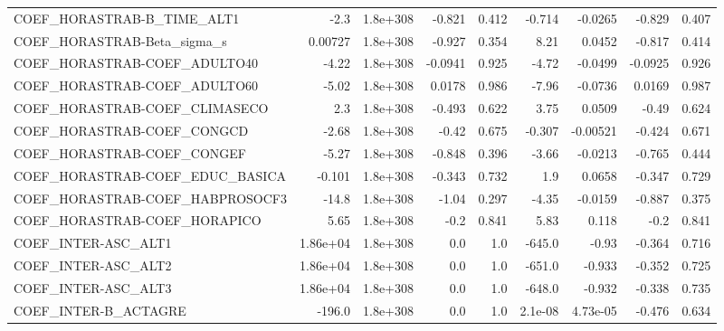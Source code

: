 \begin{tabular}{lrrrrrrrr}
COEF\_HORASTRAB-B\_TIME\_ALT1        &        -2.3 &     1.8e+308 &  -0.821 &    0.412 &     -0.714 &     -0.0265 &       -0.829 &         0.407 \\
COEF\_HORASTRAB-Beta\_sigma\_s       &     0.00727 &     1.8e+308 &  -0.927 &    0.354 &       8.21 &      0.0452 &       -0.817 &         0.414 \\
COEF\_HORASTRAB-COEF\_ADULTO40      &       -4.22 &     1.8e+308 & -0.0941 &    0.925 &      -4.72 &     -0.0499 &      -0.0925 &         0.926 \\
COEF\_HORASTRAB-COEF\_ADULTO60      &       -5.02 &     1.8e+308 &  0.0178 &    0.986 &      -7.96 &     -0.0736 &       0.0169 &         0.987 \\
COEF\_HORASTRAB-COEF\_CLIMASECO     &         2.3 &     1.8e+308 &  -0.493 &    0.622 &       3.75 &      0.0509 &        -0.49 &         0.624 \\
COEF\_HORASTRAB-COEF\_CONGCD        &       -2.68 &     1.8e+308 &   -0.42 &    0.675 &     -0.307 &    -0.00521 &       -0.424 &         0.671 \\
COEF\_HORASTRAB-COEF\_CONGEF        &       -5.27 &     1.8e+308 &  -0.848 &    0.396 &      -3.66 &     -0.0213 &       -0.765 &         0.444 \\
COEF\_HORASTRAB-COEF\_EDUC\_BASICA   &      -0.101 &     1.8e+308 &  -0.343 &    0.732 &        1.9 &      0.0658 &       -0.347 &         0.729 \\
COEF\_HORASTRAB-COEF\_HABPROSOCF3   &       -14.8 &     1.8e+308 &   -1.04 &    0.297 &      -4.35 &     -0.0159 &       -0.887 &         0.375 \\
COEF\_HORASTRAB-COEF\_HORAPICO      &        5.65 &     1.8e+308 &    -0.2 &    0.841 &       5.83 &       0.118 &         -0.2 &         0.841 \\
COEF\_INTER-ASC\_ALT1               &    1.86e+04 &     1.8e+308 &     0.0 &      1.0 &     -645.0 &       -0.93 &       -0.364 &         0.716 \\
COEF\_INTER-ASC\_ALT2               &    1.86e+04 &     1.8e+308 &     0.0 &      1.0 &     -651.0 &      -0.933 &       -0.352 &         0.725 \\
COEF\_INTER-ASC\_ALT3               &    1.86e+04 &     1.8e+308 &     0.0 &      1.0 &     -648.0 &      -0.932 &       -0.338 &         0.735 \\
COEF\_INTER-B\_ACTAGRE              &      -196.0 &     1.8e+308 &     0.0 &      1.0 &    2.1e-08 &    4.73e-05 &       -0.476 &         0.634 \\

\end{tabular}
